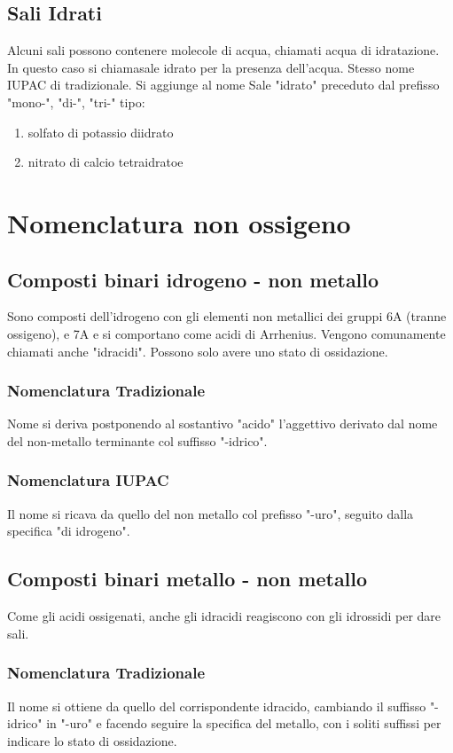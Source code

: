\documentclass[a4paper]{article}
\begin{document}
\subsection{Sali Idrati}
Alcuni sali possono contenere molecole di acqua, chiamati acqua di idratazione. In questo caso si chiamasale idrato per la presenza dell'acqua. Stesso nome IUPAC di tradizionale. Si aggiunge al nome Sale "idrato" preceduto dal prefisso "mono-", "di-", "tri-" tipo:
\begin{enumerate}
    \item {} solfato di potassio diidrato
    \item {} nitrato di calcio tetraidratoe
\end{enumerate} 


\section{Nomenclatura non ossigeno}
\subsection{Composti binari idrogeno - non metallo}
Sono composti dell'idrogeno con gli elementi non metallici dei gruppi 6A (tranne ossigeno), e 7A e si comportano come acidi di Arrhenius. Vengono comunamente chiamati anche "idracidi". Possono solo avere uno stato di ossidazione. 

\subsubsection{Nomenclatura Tradizionale}
Nome si deriva postponendo al sostantivo "acido" l'aggettivo derivato dal nome del non-metallo terminante col suffisso "-idrico". 

\subsubsection{Nomenclatura IUPAC}
Il nome si ricava da quello del non metallo col prefisso "-uro", seguito dalla specifica "di idrogeno". 

\subsection{Composti binari metallo - non metallo}
Come gli acidi ossigenati, anche gli idracidi reagiscono con gli idrossidi per dare sali. 

\subsubsection{Nomenclatura Tradizionale}
Il nome si ottiene da quello del corrispondente idracido, cambiando il suffisso "-idrico" in "-uro" e facendo seguire la specifica del metallo, con i soliti suffissi per indicare lo stato di ossidazione. 
\end{document}
